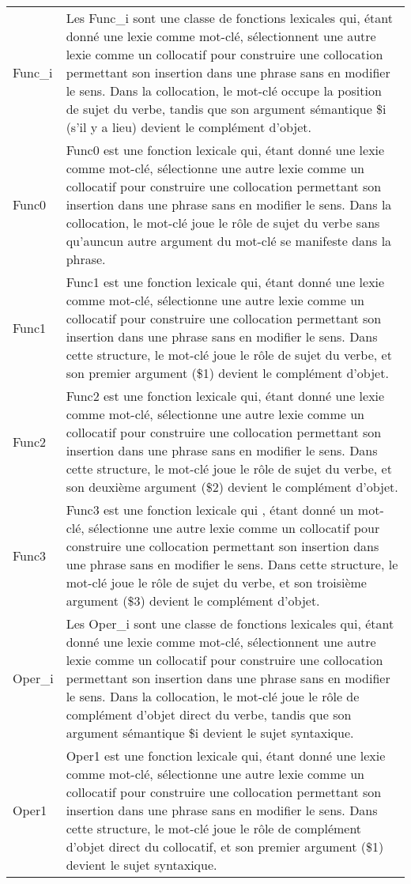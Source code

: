 \begin{longtable}{ll}
Func\_i & Les Func\_i sont une classe de fonctions lexicales qui, étant donné une lexie comme mot-clé, sélectionnent une autre lexie comme un collocatif pour construire une collocation permettant son insertion dans une phrase sans en modifier le sens. Dans la collocation, le mot-clé occupe la position de sujet du verbe, tandis que son argument sémantique \$i (s'il y a lieu) devient le complément d'objet. \\
Func0 & Func0 est une fonction lexicale qui, étant donné une lexie comme mot-clé, sélectionne une autre lexie comme un collocatif pour construire une collocation permettant son insertion dans une phrase sans en modifier le sens. Dans la collocation, le mot-clé joue le rôle de sujet du verbe sans qu'auncun autre argument du mot-clé se manifeste dans la phrase. \\
Func1 & Func1 est une fonction lexicale qui, étant donné une lexie comme mot-clé, sélectionne une autre lexie comme un collocatif pour construire une collocation permettant son insertion dans une phrase sans en modifier le sens. Dans cette structure, le mot-clé joue le rôle de sujet du verbe, et son premier argument (\$1) devient le complément d'objet. \\
Func2 & Func2 est une fonction lexicale qui, étant donné une lexie comme mot-clé, sélectionne une autre lexie comme un collocatif pour construire une collocation permettant son insertion dans une phrase sans en modifier le sens. Dans cette structure, le mot-clé joue le rôle de sujet du verbe, et son deuxième argument (\$2) devient le complément d'objet. \\
Func3 & Func3 est une fonction lexicale qui , étant donné un mot-clé, sélectionne une autre lexie comme un collocatif pour construire une collocation permettant son insertion dans une phrase sans en modifier le sens. Dans cette structure, le mot-clé joue le rôle de sujet du verbe, et son troisième argument (\$3) devient le complément d'objet. \\
Oper\_i & Les Oper\_i sont une classe de fonctions lexicales qui, étant donné une lexie comme mot-clé, sélectionnent une autre lexie comme un collocatif pour construire une collocation permettant son insertion dans une phrase sans en modifier le sens. Dans la collocation, le mot-clé joue le rôle de complément d'objet direct du verbe, tandis que son argument sémantique \$i devient le sujet syntaxique. \\
Oper1 & Oper1 est une fonction lexicale qui, étant donné une lexie comme mot-clé, sélectionne une autre lexie comme un collocatif pour construire une collocation permettant son insertion dans une phrase sans en modifier le sens. Dans cette structure, le mot-clé joue le rôle de complément d'objet direct du collocatif, et son premier argument (\$1) devient le sujet syntaxique. \\

\end{longtable}
